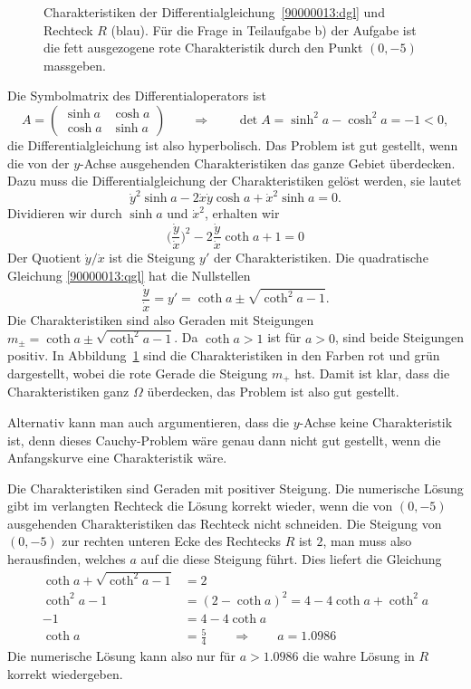 \begin{loesung}
\begin{figure}
\centering
{}
\caption{Charakteristiken der Differentialgleichung~\eqref{90000013:dgl}
und Rechteck $R$ (blau). 
Für die Frage in Teilaufgabe b) der Aufgabe ist die fett ausgezogene
rote Charakteristik durch den Punkt $(0,-5)$ massgeben.
\label{90000013:domain}}
\end{figure}
\begin{teilaufgaben}
\item
Die Symbolmatrix des Differentialoperators ist
\[
A=\begin{pmatrix}\sinh a&\cosh a \\ \cosh a&\sinh a\end{pmatrix}
\qquad\Rightarrow\qquad
\det A=\sinh^2 a - \cosh^2 a = -1<0,
\]
die Differentialgleichung ist also hyperbolisch.
Das Problem ist gut gestellt, wenn die von der $y$-Achse ausgehenden
Charakteristiken das ganze Gebiet überdecken. 
Dazu muss die Differentialgleichung der Charakteristiken gelöst werden,
sie lautet
\[
\dot y^2
\sinh a
-2
\dot x\dot y
\cosh a
+
\dot x^2
\sinh a
=0.
\]
Dividieren wir durch $\sinh a $ und $\dot x^2$, erhalten wir
\begin{equation}
\biggl(\frac{\dot y}{\dot x}\biggr)^2
-2\frac{\dot y}{\dot x} \coth a + 1=0
\label{90000013:qgl}
\end{equation}
Der Quotient $\dot y/\dot x$ ist die Steigung $y'$ der Charakteristiken.
Die quadratische Gleichung \eqref{90000013:qgl} hat die Nullstellen
\[
\frac{\dot y}{\dot x}=y'=
\coth a\pm\sqrt{\coth^2 a-1}
.
\]
Die Charakteristiken sind also Geraden mit Steigungen
$m_{\pm}=\coth a\pm\sqrt{\coth^2a-1}$.
Da $\coth a>1$ ist für $a>0$, sind beide Steigungen positiv.
In Abbildung~\ref{90000013:domain} sind die Charakteristiken in den Farben
rot und grün dargestellt, wobei die rote Gerade die Steigung $m_+$ hst.
Damit ist klar, dass die Charakteristiken ganz $\Omega$ überdecken, das
Problem ist also gut gestellt.

Alternativ kann man auch argumentieren, dass die $y$-Achse keine 
Charakteristik ist, denn dieses Cauchy-Problem wäre genau dann
nicht gut gestellt, wenn die Anfangskurve eine Charakteristik wäre.
\item
Die Charakteristiken sind Geraden mit positiver Steigung.
Die numerische Lösung gibt im verlangten Rechteck die Lösung
korrekt wieder, wenn die von $(0,-5)$ ausgehenden Charakteristiken
das Rechteck nicht schneiden.
Die Steigung von $(0,-5)$ zur rechten unteren Ecke des Rechtecks $R$
ist $2$, 
man muss also herausfinden, welches $a$ auf die diese Steigung führt.
Dies liefert die Gleichung
\begin{align*}
\coth a + \sqrt{\coth^2 a-1}&=2
\\
\coth^2 a-1&=(2-\coth a)^2=4-4\coth a +\coth^2 a
\\
-1 &=4-4\coth a
\\
\coth a&=\frac54
\qquad\Rightarrow\qquad
a=1.0986
\end{align*}
Die numerische Lösung kann also nur für $a>1.0986$ die wahre Lösung in
$R$ korrekt wiedergeben.
\qedhere
\end{teilaufgaben}
\end{loesung}

